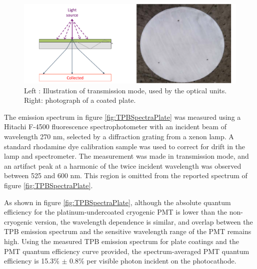 \begin{figure}
\centering 
\includegraphics[width=\textwidth]{./figures/PlateModeAndPhoto.pdf}
\caption{Left : Illustration of transmission mode, used by the optical units. Right: photograph of a coated plate. \label{fig:PlateCoating}}
\end{figure}

The emission spectrum in figure \ref{fig:TPBSpectraPlate} was measured using a Hitachi F-4500 fluorescence spectrophotometer with an incident beam of wavelength 270 nm, selected by a diffraction grating from a xenon lamp.  A standard rhodamine dye calibration sample was used to correct for drift in the lamp and spectrometer.  The measurement was made in transmission mode, and an artifact peak at a harmonic of the twice incident wavelength was observed between 525 and 600 nm.  This region is omitted from the reported spectrum of figure \ref{fig:TPBSpectraPlate}.  

As shown in figure \ref{fig:TPBSpectraPlate}, although the absolute quantum efficiency for the platinum-undercoated cryogenic PMT is lower than the non-cryogenic version, the wavelength dependence is similar, and overlap between the TPB emission spectrum and the sensitive wavelength range of the PMT remains high.  Using the measured TPB emission spectrum for plate coatings and the PMT quantum efficiency curve provided, the spectrum-averaged PMT quantum efficiency is 15.3\% $\pm$ 0.8\% per visible photon incident on the photocathode. 

